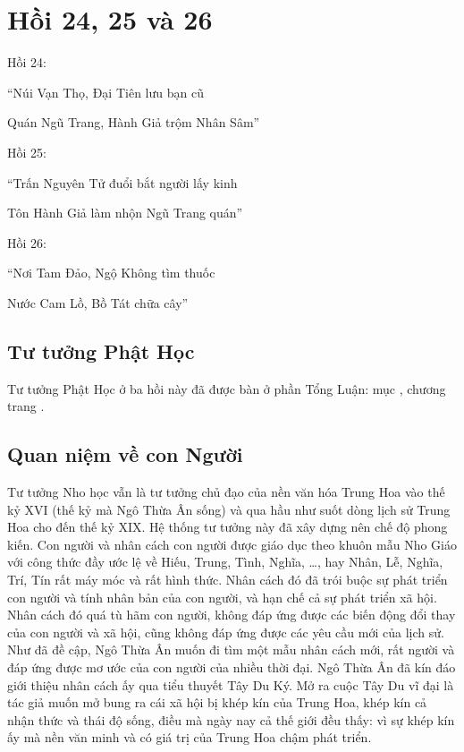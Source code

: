 \chapter{Hồi 24, 25 và 26} %
\label{cha:hoi_24_25_26}

Hồi 24:

\begin{itshape}
``Núi Vạn Thọ, Đại Tiên lưu bạn cũ

Quán Ngũ Trang, Hành Giả trộm Nhân Sâm''
\end{itshape}

Hồi 25:

\begin{itshape}
``Trấn Nguyên Tử đuổi bắt người lấy kinh

Tôn Hành Giả làm nhộn Ngũ Trang quán''
\end{itshape}

Hồi 26:

\begin{itshape}
``Nơi Tam Đảo, Ngộ Không tìm thuốc

Nước Cam Lồ, Bồ Tát chữa cây''
\end{itshape}

\section{Tư tưởng Phật Học} %
\label{sec:24_25_26_phat_hoc}

Tư tưởng Phật Học ở ba hồi này đã được bàn ở phần Tổng Luận: mục , chương  trang \pageref{sec:bieu_tuong_cua_hoi_thu_26}.

\section{Quan niệm về con Người} %
\label{sec:24_25_26_con_nguoi}

Tư tưởng Nho học vẫn là tư tưởng chủ đạo của nền văn hóa Trung Hoa vào thế kỷ XVI (thế kỷ mà Ngô Thừa Ân sống) và qua hầu như suốt dòng lịch sử Trung Hoa cho đến thế kỷ XIX. Hệ thống tư tưởng này đã xây dựng nên chế độ phong kiến. Con người và nhân cách con người được giáo dục theo khuôn mẫu Nho Giáo với công thức đầy ước lệ về Hiếu, Trung, Tình, Nghĩa, \ldots, hay Nhân, Lễ, Nghĩa, Trí, Tín rất máy móc và rất hình thức. Nhân cách đó đã trói buộc sự phát triển con người và tính nhân bản của con người, và hạn chế cả sự phát triển xã hội. Nhân cách đó quá tù hãm con người, không đáp ứng được các biến động đổi thay của con người và xã hội, cũng không đáp ứng được các yêu cầu mới của lịch sử. Như đã đề cập, Ngô Thừa Ân muốn đi tìm một mẫu nhân cách mới, rất người và đáp ứng được mơ ước của con người của nhiều thời đại. Ngô Thừa Ân đã kín đáo giới thiệu nhân cách ấy qua tiểu thuyết Tây Du Ký. Mở ra cuộc Tây Du vĩ đại là tác giả muốn mở bung ra cái xã hội bị khép kín của Trung Hoa, khép kín cả nhận thức và thái độ sống, điều mà ngày nay cả thế giới đều thấy: vì sự khép kín ấy mà nền văn minh và có giá trị của Trung Hoa chậm phát triển.


